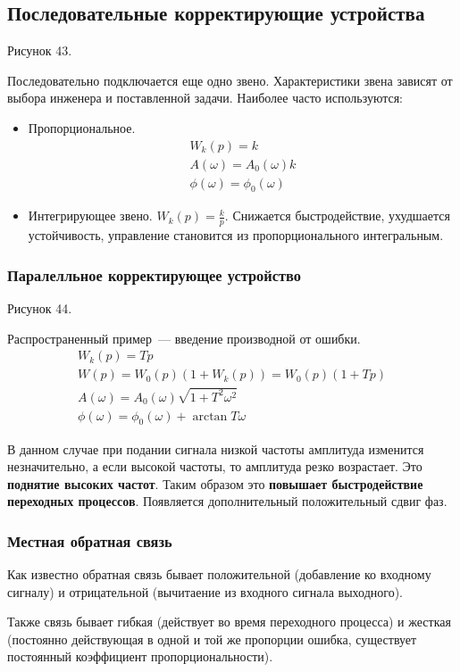 \subsection{Последовательные корректирующие устройства}
Рисунок 43.

Последовательно подключается еще одно звено. Характеристики звена зависят от выбора инженера и поставленной задачи. Наиболее часто используются:
\begin{itemize}
	\item Пропорциональное.
	\begin{align*}
		W_k(p)=k \\
		A(\omega) = A_0(\omega)k \\
		\phi(\omega)=\phi_0(\omega)
	\end{align*}
	\item Интегрирующее звено. $W_k(p)=\frac{k}p$. Снижается быстродействие, ухудшается устойчивость, управление становится из пропорционального интегральным.
\end{itemize}
\subsubsection{Паралелльное корректирующее устройство}
Рисунок 44.

Распространенный пример~--- введение производной от ошибки.
\begin{align*}
	W_k(p)=Tp \\
	W(p)=W_0(p)(1+W_k(p))=W_0(p)(1+Tp) \\
	A(\omega)=A_0(\omega)\sqrt{1+T^2\omega^2} \\
	\phi(\omega)=\phi_0(\omega)+\arctan{}T\omega
\end{align*}

В данном случае при подании сигнала низкой частоты амплитуда изменится незначительно, а если высокой частоты, то амплитуда резко возрастает. Это \textbf{поднятие высоких частот}. Таким образом это \textbf{повышает быстродействие переходных процессов}. Появляется дополнительный положительный сдвиг фаз.

\subsubsection{Местная обратная связь}
Как известно обратная связь бывает положительной (добавление ко входному сигналу) и отрицательной (вычитаение из входного сигнала выходного).

Также связь бывает гибкая (действует во время переходного процесса) и жесткая (постоянно действующая в одной и той же пропорции ошибка, существует постоянный коэффициент пропорциональности).


